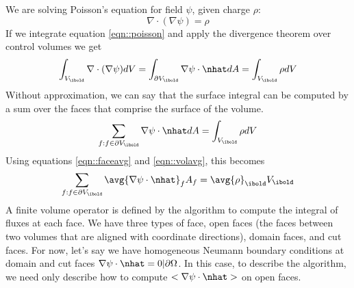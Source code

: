 \documentclass{article}
\begin{document}
We are solving Poisson's equation for field $\psi$, given charge $\rho$:
\begin{equation}
  \nabla \cdot (\nabla \psi) = \rho
  \label{eqn::poisson}
\end{equation}
If we integrate equation \ref{eqn::poisson} and apply the divergence theorem 
over control volumes we get
\begin{equation}
\int_{V_\ibold} \nabla \cdot (\nabla \psi ) dV = \int_{\partial
  V_\ibold} \nabla \psi\cdot \nhat  dA = \int_{V_\ibold} \rho dV
\end{equation}
Without approximation, we can say that the surface integral can be
computed by a sum over the faces that comprise the surface of the
volume.
\begin{equation}
\sum_{f: f \in \partial V_\ibold} \nabla \psi \cdot \nhat dA = \int_{V_\ibold} \rho dV
\end{equation}
Using equations \ref{eqn::faceavg} and \ref{eqn::volavg}, this becomes 
\begin{equation}
\sum_{f: f \in \partial V_\ibold} \avg{\nabla \psi \cdot \nhat}_f A_f
= \avg{\rho}_\ibold V_\ibold
\label{eqn::discretePoisson}
\end{equation}
A finite volume operator is defined by the algorithm to compute the
integral of fluxes at each face.  We have three types of face, open
faces (the faces between two volumes that are aligned with coordinate
directions), domain faces, and cut faces.  For now, let's say we have
homogeneous Neumann boundary conditions at domain and cut faces
$\nabla \psi \cdot \nhat = 0 |\partial \Omega$.  In this case, to
describe the algorithm, we need only describe how to compute 
$<\nabla\psi \cdot \nhat>$ on open faces.
\end{document}
